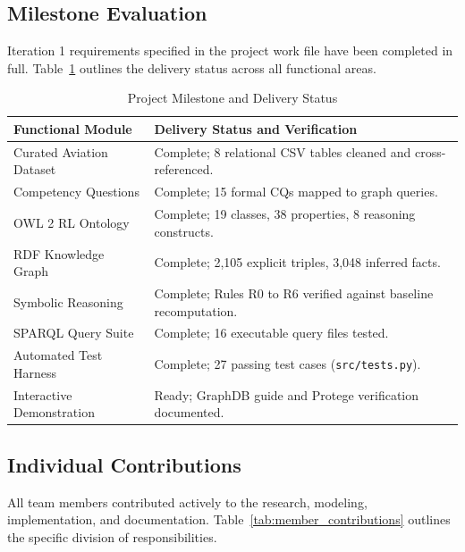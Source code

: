 \documentclass[conference]{IEEEtran}
\begin{document}
\subsection{Milestone Evaluation}
Iteration 1 requirements specified in the project work file have been completed in full. Table~\ref{tab:progress_status} outlines the delivery status across all functional areas.

\begin{table}[htbp]
\caption{Project Milestone and Delivery Status}
\label{tab:progress_status}
\centering
\begin{tabular}{lp{4.8cm}}
\toprule
\textbf{Functional Module} & \textbf{Delivery Status and Verification} \\
\midrule
Curated Aviation Dataset & Complete; 8 relational CSV tables cleaned and cross-referenced. \\
Competency Questions & Complete; 15 formal CQs mapped to graph queries. \\
OWL 2 RL Ontology & Complete; 19 classes, 38 properties, 8 reasoning constructs. \\
RDF Knowledge Graph & Complete; 2,105 explicit triples, 3,048 inferred facts. \\
Symbolic Reasoning & Complete; Rules R0 to R6 verified against baseline recomputation. \\
SPARQL Query Suite & Complete; 16 executable query files tested. \\
Automated Test Harness & Complete; 27 passing test cases (\texttt{src/tests.py}). \\
Interactive Demonstration & Ready; GraphDB guide and Protege verification documented. \\
\bottomrule
\end{tabular}
\end{table}

\subsection{Individual Contributions}
All team members contributed actively to the research, modeling, implementation, and documentation. Table~\ref{tab:member_contributions} outlines the specific division of responsibilities.
\end{document}
